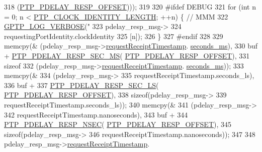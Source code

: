 \begin{DoxyCode}
{{{{{{{318                                (\hyperlink{avbts__message_8hpp_a7c20f0e32d4408c124fa9e115ab32cf3}{PTP\_PDELAY\_RESP\_OFFSET})));
319 
320 \textcolor{preprocessor}{#ifdef DEBUG}
321             \textcolor{keywordflow}{for} (\textcolor{keywordtype}{int} n = 0; n < \hyperlink{ptptypes_8hpp_afd1566058ed7927c2b790c9d4a0051ec}{PTP\_CLOCK\_IDENTITY\_LENGTH}; ++n) \{  \textcolor{comment}{// MMM}
322                 \hyperlink{gptp__log_8hpp_add03384a2a8099b27e07d041cce77e6f}{GPTP\_LOG\_VERBOSE}(\textcolor{stringliteral}{"%
323                     pdelay\_resp\_msg->
324                     requestingPortIdentity.clockIdentity
325                     [n]);
326             \}
327 \textcolor{preprocessor}{#endif}
328 
329             memcpy(& (pdelay\_resp\_msg->\hyperlink{class_p_t_p_message_path_delay_resp_a981c3fe148ecddf9f1091675650ccd48}{requestReceiptTimestamp}.
      \hyperlink{class_timestamp_a5d98378d782519e6f9c17db70f1620f0}{seconds\_ms}),
330                    buf + \hyperlink{avbts__message_8hpp_a5afc93370bc70d23f95f2acbe53749d8}{PTP\_PDELAY\_RESP\_SEC\_MS}(
      \hyperlink{avbts__message_8hpp_a7c20f0e32d4408c124fa9e115ab32cf3}{PTP\_PDELAY\_RESP\_OFFSET}),
331                    \textcolor{keyword}{sizeof}
332                    (pdelay\_resp\_msg->\hyperlink{class_p_t_p_message_path_delay_resp_a981c3fe148ecddf9f1091675650ccd48}{requestReceiptTimestamp}.
      \hyperlink{class_timestamp_a5d98378d782519e6f9c17db70f1620f0}{seconds\_ms}));
333             memcpy(&
334                    (pdelay\_resp\_msg->
335                 requestReceiptTimestamp.seconds\_ls),
336                    buf +
337                    \hyperlink{avbts__message_8hpp_a8a6d2e369c19399ba34d40de83e3d318}{PTP\_PDELAY\_RESP\_SEC\_LS}(
      \hyperlink{avbts__message_8hpp_a7c20f0e32d4408c124fa9e115ab32cf3}{PTP\_PDELAY\_RESP\_OFFSET}),
338                    \textcolor{keyword}{sizeof}(pdelay\_resp\_msg->
339                       requestReceiptTimestamp.seconds\_ls));
340             memcpy(&
341                    (pdelay\_resp\_msg->
342                 requestReceiptTimestamp.nanoseconds),
343                    buf +
344                    \hyperlink{avbts__message_8hpp_aa670bfeed173fa1a7937337fb6210f69}{PTP\_PDELAY\_RESP\_NSEC}(
      \hyperlink{avbts__message_8hpp_a7c20f0e32d4408c124fa9e115ab32cf3}{PTP\_PDELAY\_RESP\_OFFSET}),
345                    \textcolor{keyword}{sizeof}(pdelay\_resp\_msg->
346                       requestReceiptTimestamp.nanoseconds));
347 
348             pdelay\_resp\_msg->\hyperlink{class_p_t_p_message_path_delay_resp_a981c3fe148ecddf9f1091675650ccd48}{requestReceiptTimestamp}.
}}}}}}}}
\end{DoxyCode}
